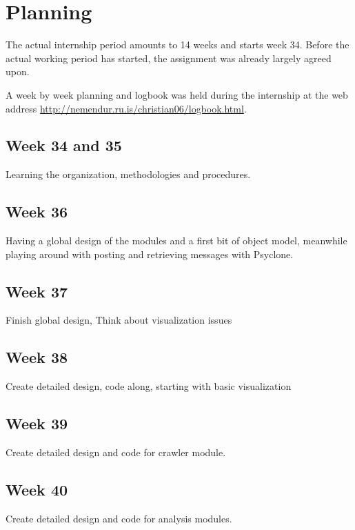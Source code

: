 \chapter{\label{cpt:planning}Planning}

The actual internship period amounts to 14 weeks and starts week 34. Before the
actual working period has started, the assignment was already largely agreed
upon.

A week by week planning and logbook was held during the internship at the web
address \url{http://nemendur.ru.is/christian06/logbook.html}.

\section{Week 34 and 35}

Learning the organization, methodologies and procedures.

\section{Week 36}

Having a global design of the modules and a first bit of object model,
meanwhile playing around with posting and retrieving messages with Psyclone.

\section{Week 37}

Finish global design, Think about visualization issues

\section{Week 38}

Create detailed design, code along, starting with basic visualization

\section{Week 39}

Create detailed design and code for crawler module. 

\section{Week 40}

Create detailed design and code for analysis modules.

